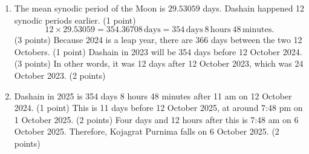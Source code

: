 \begin{enumerate}
\item The mean synodic period of the Moon is $29.53059$ days. Dashain happened 12 synodic periods earlier. \hfill(1 point)
\[12\times29.53059=354.36708\,\mathrm{days}=354\,\mathrm{days}\ 8\,\mathrm{hours}\ 48\,\mathrm{minutes}.\]
\hfill(3 points)
Because 2024 is a leap year, there are 366 days between the two 12 Octobers. \hfill(1 point)
Dashain in 2023 will be 354 days before 12 October 2024. \hfill(3 points)
In other words, it was 12 days after 12 October 2023, which was 24 October 2023. \hfill(2 points)
\item Dashain in 2025 is 354 days 8 hours 48 minutes after 11 am on 12 October 2024. \hfill(1 point)
This is 11 days before 12 October 2025, at around 7:48 pm on 1 October 2025. \hfill(2 points)
Four days and 12 hours after this is 7:48 am on 6 October 2025. Therefore, Kojagrat Purnima falls on 6 October 2025. \hfill(2 points)
\end{enumerate}
